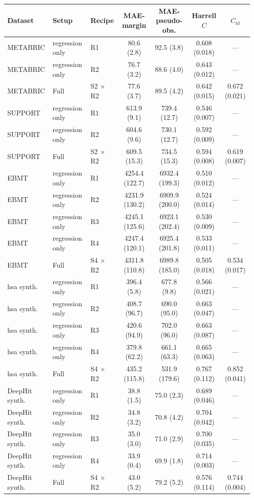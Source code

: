 \begin{tabular}{lllcccc}
\toprule
Dataset & Setup & Recipe & MAE-margin & MAE-pseudo-obs. & Harrell $C$ & $C_{td}$ \\
\midrule
METABRIC & regression only & R1 & 80.6 (2.8) & 92.5 (3.8) & 0.608 (0.018) & --- \\
METABRIC & regression only & R2 & 76.7 (3.2) & 88.6 (4.0) & 0.643 (0.012) & --- \\
METABRIC & Full & S2 $\times$ R2 & 77.6 (3.7) & 89.5 (4.2) & 0.642 (0.015) & 0.672 (0.021) \\
\midrule
SUPPORT & regression only & R1 & 613.9 (9.1) & 739.4 (12.7) & 0.546 (0.007) & --- \\
SUPPORT & regression only & R2 & 604.6 (9.6) & 730.1 (12.7) & 0.592 (0.009) & --- \\
SUPPORT & Full & S2 $\times$ R2 & 609.5 (15.3) & 734.5 (15.3) & 0.594 (0.008) & 0.619 (0.007) \\
\midrule
EBMT & regression only & R1 & 4254.4 (122.7) & 6932.4 (199.3) & 0.510 (0.012) & --- \\
EBMT & regression only & R2 & 4231.9 (130.2) & 6909.9 (200.0) & 0.524 (0.014) & --- \\
EBMT & regression only & R3 & 4245.1 (125.6) & 6923.1 (202.4) & 0.530 (0.009) & --- \\
EBMT & regression only & R4 & 4247.4 (120.1) & 6925.4 (201.8) & 0.533 (0.011) & --- \\
EBMT & Full & S4 $\times$ R2 & 4311.8 (110.8) & 6989.8 (185.0) & 0.505 (0.018) & 0.534 (0.017) \\
\midrule
hsa synth. & regression only & R1 & 396.4 (5.8) & 677.8 (9.8) & 0.566 (0.021) & --- \\
hsa synth. & regression only & R2 & 408.7 (96.7) & 690.0 (95.0) & 0.663 (0.047) & --- \\
hsa synth. & regression only & R3 & 420.6 (94.9) & 702.0 (96.0) & 0.663 (0.087) & --- \\
hsa synth. & regression only & R4 & 379.8 (62.2) & 661.1 (63.3) & 0.665 (0.063) & --- \\
hsa synth. & Full & S4 $\times$ R2 & 435.2 (115.8) & 531.9 (179.6) & 0.767 (0.112) & 0.852 (0.041) \\
\midrule
DeepHit synth. & regression only & R1 & 38.8 (1.5) & 75.0 (2.3) & 0.689 (0.046) & --- \\
DeepHit synth. & regression only & R2 & 34.8 (3.2) & 70.8 (4.2) & 0.704 (0.042) & --- \\
DeepHit synth. & regression only & R3 & 35.0 (3.0) & 71.0 (2.9) & 0.700 (0.035) & --- \\
DeepHit synth. & regression only & R4 & 33.9 (0.4) & 69.9 (1.8) & 0.714 (0.003) & --- \\
DeepHit synth. & Full & S4 $\times$ R2 & 43.0 (5.2) & 79.2 (5.2) & 0.576 (0.114) & 0.744 (0.004) \\
\bottomrule
\end{tabular}
